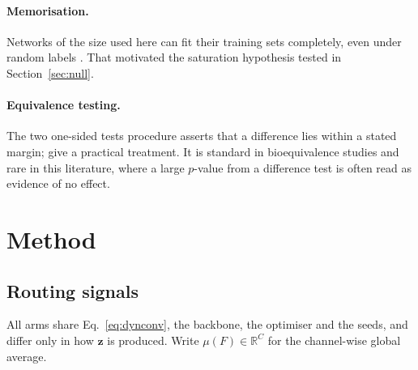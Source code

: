 \documentclass[10pt,a4paper]{article}
\newcommand{\zv}{\mathbf{z}}
\begin{document}
\paragraph{Memorisation.} Networks of the size used here can fit their
training sets completely, even under random labels \citep{zhang2017}.
That motivated the saturation hypothesis tested in Section~\ref{sec:null}.

\paragraph{Equivalence testing.} The two one-sided tests procedure
\citep{schuirmann1987} asserts that a difference lies within a stated
margin; \citet{lakens2017} give a practical treatment. It is standard in
bioequivalence studies and rare in this literature, where a large
$p$-value from a difference test is often read as evidence of no effect.

\section{Method}\label{sec:method}

\subsection{Routing signals}

All arms share Eq.~\eqref{eq:dynconv}, the backbone, the optimiser and the
seeds, and differ only in how $\zv$ is produced. Write
$\mu(F)\in\mathbb{R}^{C}$ for the channel-wise global average.
\end{document}
